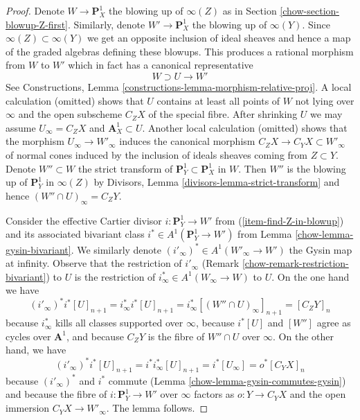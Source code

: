 \begin{proof}

Denote $W \to \mathbf{P}^1_X$ the blowing up of $\infty(Z)$ as in
Section \ref{chow-section-blowup-Z-first}.
Similarly, denote $W' \to \mathbf{P}^1_X$ the blowing up of $\infty(Y)$.
Since $\infty(Z) \subset \infty(Y)$ we get an opposite inclusion
of ideal sheaves and hence a map of the graded algebras
defining these blowups. This produces a rational morphism from $W$
to $W'$ which in fact has a canonical representative
$$
W \supset U \longrightarrow W'
$$
See Constructions, Lemma \ref{constructions-lemma-morphism-relative-proj}.
A local calculation (omitted) shows that $U$ contains at least all points
of $W$ not lying over $\infty$ and the open subscheme $C_Z X$ of the special
fibre. After shrinking $U$ we may assume $U_\infty = C_Z X$ and
$\mathbf{A}^1_X \subset U$. Another local calculation (omitted)
shows that the morphism $U_\infty \to W'_\infty$
induces the canonical morphism $C_Z X \to C_Y X \subset W'_\infty$
of normal cones induced by the inclusion of ideals sheaves
coming from $Z \subset Y$. Denote $W'' \subset W$ the strict transform of
$\mathbf{P}^1_Y \subset \mathbf{P}^1_X$ in $W$. Then $W''$ is the blowing
up of $\mathbf{P}^1_Y$ in $\infty(Z)$ by
Divisors, Lemma \ref{divisors-lemma-strict-transform}
and hence $(W'' \cap U)_\infty = C_ZY$.

\medskip\noindent
Consider the effective Cartier divisor $i : \mathbf{P}^1_Y \to W'$
from (\ref{item-find-Z-in-blowup}) and its associated bivariant class
$i^* \in A^1(\mathbf{P}^1_Y \to W')$ from Lemma \ref{chow-lemma-gysin-bivariant}.
We similarly denote $(i'_\infty)^* \in A^1(W'_\infty \to W')$ the
Gysin map at infinity. Observe that the restriction of $i'_\infty$
(Remark \ref{chow-remark-restriction-bivariant}) to $U$ is the restriction of
$i_\infty^* \in A^1(W_\infty \to W)$ to $U$. On the one hand we have
$$
(i'_\infty)^* i^* [U]_{n + 1} =
i_\infty^* i^* [U]_{n + 1} =
i_\infty^* [(W'' \cap U)_\infty]_{n + 1} =
[C_ZY]_n
$$
because $i_\infty^*$ kills all classes supported over $\infty$, because
$i^*[U]$ and $[W'']$ agree as cycles over $\mathbf{A}^1$, and because
$C_ZY$ is the fibre of $W'' \cap U$ over $\infty$.
On the other hand, we have
$$
(i'_\infty)^* i^* [U]_{n + 1} =
i^* i_\infty^*[U]_{n + 1} =
i^* [U_\infty] =
o^*[C_YX]_n
$$
because $(i'_\infty)^*$ and $i^*$ commute
(Lemma \ref{chow-lemma-gysin-commutes-gysin})
and because the fibre of $i : \mathbf{P}^1_Y \to W'$ over $\infty$
factors as $o : Y \to C_YX$ and the open immersion $C_YX \to W'_\infty$.
The lemma follows.
\end{proof}

